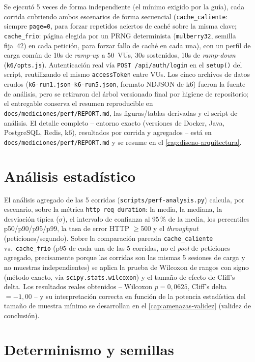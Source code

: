 Se ejecutó 5 veces de forma independiente (el mínimo exigido por la
guía), cada corrida cubriendo ambos escenarios de forma secuencial
(\texttt{cache\_caliente}: siempre \texttt{page=0}, para forzar
repetidos aciertos de caché sobre la misma clave; \texttt{cache\_frio}:
página elegida por un PRNG determinista (\texttt{mulberry32}, semilla
fija~42) en cada petición, para forzar fallo de caché en cada una), con
un perfil de carga común de 10s de \emph{ramp-up} a 50~VUs, 30s
sostenidos, 10s de \emph{ramp-down}
(\texttt{k6/opts.js}). Autenticación real vía \texttt{POST /api/auth/login}
en el \texttt{setup()} del script, reutilizando el mismo
\texttt{accessToken} entre VUs. Los cinco archivos de datos crudos
(\texttt{k6-run1.json}--\texttt{k6-run5.json}, formato NDJSON de k6) fueron
la fuente de análisis, pero se retiraron del árbol versionado final por
higiene de repositorio; el entregable conserva el resumen reproducible en
\texttt{docs/mediciones/perf/REPORT.md}, las figuras/tablas derivadas y el
script de análisis. El detalle completo -- entorno exacto
(versiones de Docker, Java, PostgreSQL, Redis, k6), resultados por
corrida y agregados -- está en \texttt{docs/mediciones/perf/REPORT.md} y
se resume en el \autoref{cap:diseno-arquitectura}.

\section{Análisis estadístico}

El análisis agregado de las 5 corridas (\texttt{scripts/perf-analysis.py})
calcula, por escenario, sobre la métrica \texttt{http\_req\_duration}: la
media, la mediana, la desviación típica ($\sigma$), el intervalo de
confianza al 95\,\% de la media, los percentiles p50/p90/p95/p99, la tasa
de error HTTP $\geq$500 y el \emph{throughput} (peticiones/segundo). Sobre
la comparación pareada \texttt{cache\_caliente} vs.\ \texttt{cache\_frio}
(p95 de cada una de las 5 corridas, no el \emph{pool} de peticiones
agregado, precisamente porque las corridas son las mismas 5 sesiones de
carga y no muestras independientes) se aplica la prueba de Wilcoxon de
rangos con signo (método exacto, vía \texttt{scipy.stats.wilcoxon}) y el
tamaño de efecto de Cliff's delta. Los resultados reales obtenidos --
Wilcoxon $p=0{,}0625$, Cliff's delta $=-1{,}00$ -- y su interpretación
correcta en función de la potencia estadística del tamaño de muestra
mínimo se desarrollan en el \autoref{cap:amenazas-validez} (validez de
conclusión).

\section{Determinismo y semillas}
\label{sec:mm-semillas}

